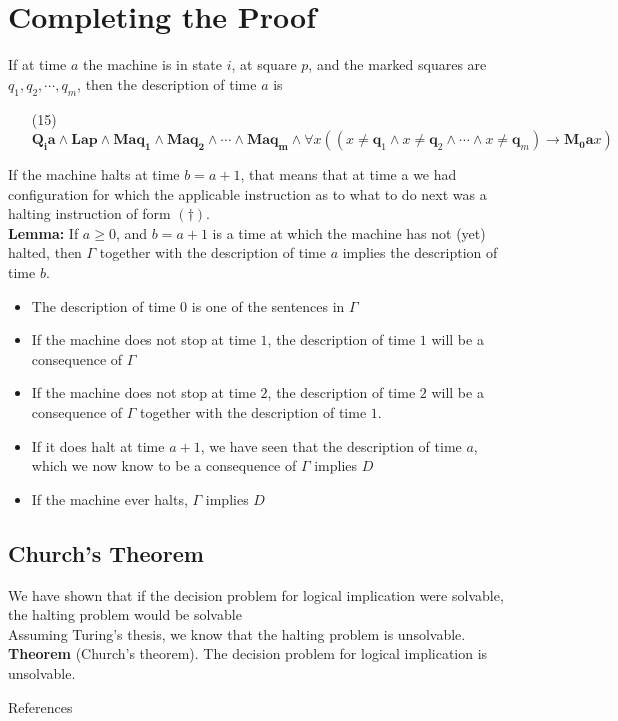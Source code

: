 \documentclass[
11pt,notheorems,hyperref={pdfauthor=whatever}
]{beamer}
\begin{document}
\section{Completing the Proof}
\begin{frame}
If at time $a$ the machine is in state $i$, at square $p$, and the marked squares are $q_1,q_2,\cdots,q_m$, then the description of time $a$ is
\vspace{1em}
\begin{enumerate}
    \item[(15)] $\pmb{Q_i a}\wedge\pmb{Lap}\wedge\pmb{Maq_1}\wedge\pmb{Maq_2}\wedge\cdots\wedge\pmb{Maq_m} \wedge \forall x((x\neq\pmb{q}_1\wedge x\neq\pmb{q}_2\wedge \cdots\wedge x\neq\pmb{q}_m)\to \pmb{M_0 a}x)$
\end{enumerate}
\vspace{1em}
If the machine halts at time $b = a + 1$, that means that at time a we had configuration for which the applicable instruction as to what to do next was a halting instruction of form $(\dagger)$.\\
\vspace{1em}
\textbf{Lemma:} If $a\ge0$, and $b = a+1$ is a time at which the machine has not (yet) halted, then $\Gamma$ together with the description of time $a$ implies the description of time $b$.
\vspace{1em}
\begin{itemize}
    \item The description of time $0$ is one of the sentences in $\Gamma$
    \item If the machine does not stop at time $1$, the description of time $1$ will be a consequence of $\Gamma$
    \item If the machine does not stop at time $2$, the description of time $2$ will be a consequence of $\Gamma$ together with the description of time $1$.
    \item If it does halt at time $a+1$, we have seen that the description of time $a$, which we now know to be a consequence of $\Gamma$ implies $D$
    \item If the machine ever halts, $\Gamma$ implies $D$
\end{itemize}
\end{frame}

\subsection{Church's Theorem}
\begin{frame}
    We have shown that if the decision problem for logical implication were solvable, the halting problem would be solvable\\
    \vspace{2em}
    Assuming Turing's thesis, we know that the halting problem is unsolvable.\\
    \vspace{5em}
    \textbf{Theorem} (Church’s theorem). The decision problem for logical implication is unsolvable.
\end{frame}

\begin{frame}[allowframebreaks]{References}
    \printbibliography
\end{frame}
\end{document}
